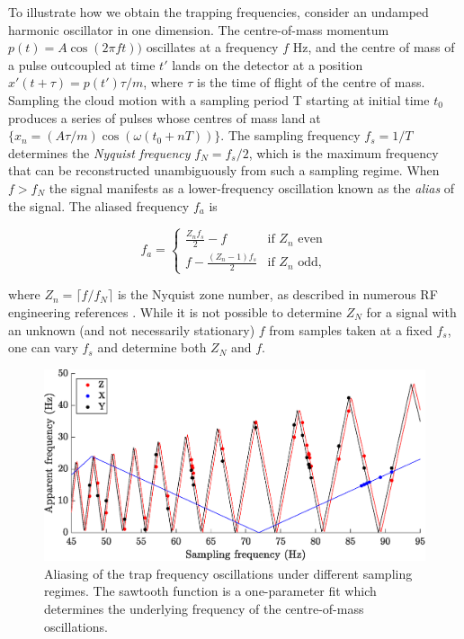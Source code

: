 	To illustrate how we obtain the trapping frequencies, consider an undamped harmonic oscillator in one dimension. The centre-of-mass momentum $p(t) = A \cos(2\pi f t))$ oscillates at a frequency $f$ Hz, and the centre of mass of a pulse outcoupled at time $t'$ lands on the detector at a position $x'(t+\tau) = p(t')\tau/m$, where $\tau$ is the time of flight of the centre of mass. Sampling the cloud motion with a sampling period T starting at initial time $t_0$ produces a series of pulses whose centres of mass land at $\{x_n = (A\tau/m) \cos(\omega(t_0+nT))\}$. The sampling frequency $f_s=1/T$ determines the \emph{Nyquist frequency} $f_N=f_s/2$, which is the maximum frequency that can be reconstructed unambiguously from such a sampling regime. When $f>f_N$ the signal manifests as a lower-frequency oscillation known as the \emph{alias} of the signal. The aliased frequency $f_a$ is

	\begin{equation}
	 f_a =
	  \begin{cases}
	   \frac{Z_n f_s}{2} - f & \text{if } Z_n \text{ even} \\
	   f - \frac{(Z_n-1)f_s}{2}       & \text{if } Z_n \text{ odd},
	  \end{cases}
	  \label{eqn:Z_N}
	\end{equation}
	
	where $Z_n = \lceil{f/f_N}\rceil$ is the Nyquist zone number, as described in numerous RF engineering references . While it is not possible to determine $Z_N$ for a signal with an unknown (and not necessarily stationary) $f$ from samples taken at a fixed $f_s$, one can vary $f_s$ and determine both $Z_N$ and $f$.
	
	\begin{figure}
		\begin{minipage}{0.68\textwidth}
		\vspace{0pt}
		\includegraphics[width=\textwidth]{fig/tuneout/sawtooth_plot}
		\end{minipage}
		\hfill
		\begin{minipage}{0.3\textwidth}
		\vspace{0pt}
			\caption{Aliasing of the trap frequency oscillations under different sampling regimes. The sawtooth function is a one-parameter fit which determines the underlying frequency of the centre-of-mass oscillations.}
			\label{fig:sawtooth_plot}
		\end{minipage}
	\end{figure}	


